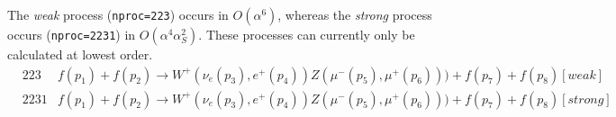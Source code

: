 The {\it weak} process ({\tt nproc=223})  occurs in $O(\alpha^6)$, 
whereas the {\it strong} process occurs ({\tt nproc=2231}) in $O(\alpha^4 \alpha_S^2)$.  These processes
can currently only be calculated at lowest order.
\begin{eqnarray}
& 223  & f(p_1)+f(p_2) \to W^+(\nu_e(p_3),e^+(p_4))Z(\mu^-(p_5),\mu^+(p_6)))+f(p_7)+f(p_8) [weak]  \nonumber \\
& 2231 & f(p_1)+f(p_2) \to W^+(\nu_e(p_3),e^+(p_4))Z(\mu^-(p_5),\mu^+(p_6)))+f(p_7)+f(p_8) [strong]  \nonumber
\end{eqnarray}
